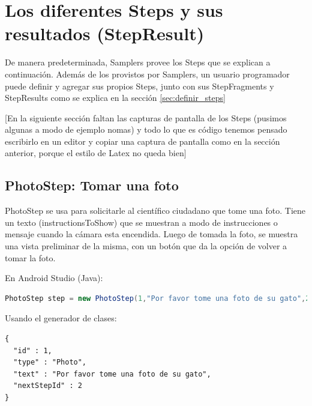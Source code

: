 \chapter{Los diferentes Steps y sus resultados (StepResult)} \label{sec:steps_detallados}
De manera predeterminada, Samplers provee los Steps que se explican a continuación. Además de los provistos por Samplers, un usuario programador puede definir y agregar sus propios Steps, junto con sus StepFragments y StepResults como se explica en la sección \ref{sec:definir_steps} 


[En la siguiente sección faltan las capturas de pantalla de los Steps (pusimos algunas a modo de ejemplo nomas) y todo lo que es código tenemos pensado escribirlo en un editor y copiar una captura de pantalla como en la sección anterior, porque el estilo de Latex no queda bien]

\section{PhotoStep: Tomar una foto}
PhotoStep se usa para solicitarle al científico ciudadano que tome una foto. Tiene un texto (instructionsToShow) que se muestran a modo de instrucciones o mensaje cuando la cámara esta encendida. Luego de tomada la foto, se muestra una vista preliminar de la misma, con un botón que da la opción de volver a tomar la foto.

En Android Studio (Java):
\begin{lstlisting}[language=Java, frame=tlb]	
PhotoStep step = new PhotoStep(1,"Por favor tome una foto de su gato",2);
\end{lstlisting}

Usando el generador de clases:
\begin{lstlisting}[language=XML, frame=tlb]	
{
  "id" : 1,
  "type" : "Photo",
  "text" : "Por favor tome una foto de su gato",
  "nextStepId" : 2
}
\end{lstlisting}


